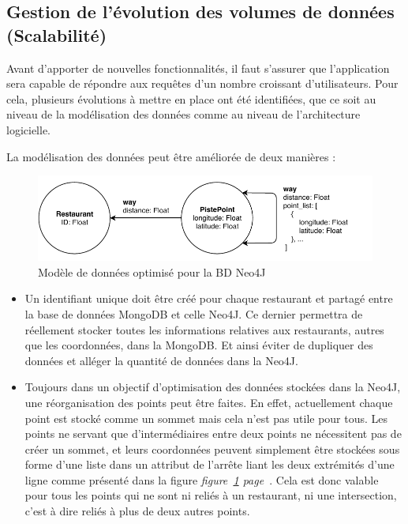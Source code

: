 \documentclass[12pt]{article}
\begin{document}
\subsection{Gestion de l'évolution des volumes de données (Scalabilité)}

    Avant d'apporter de nouvelles fonctionnalités, il faut s'assurer que l'application sera capable de répondre aux requêtes d'un nombre croissant d'utilisateurs. Pour cela, plusieurs évolutions à mettre en place ont été identifiées, que ce soit au niveau de la modélisation des données comme au niveau de l'architecture logicielle.

    La modélisation des données peut être améliorée de deux manières :

    \begin{figure}[h]
        \centering
        \includegraphics[scale=1]{images/updated_neo_model.pdf}
        \caption{\label{updated_neo_model} Modèle de données optimisé pour la BD Neo4J}
    \end{figure}
    
    \begin{itemize}
        \item Un identifiant unique doit être créé pour chaque restaurant et partagé entre la base de données MongoDB et celle Neo4J. Ce dernier permettra de réellement stocker toutes les informations relatives aux restaurants, autres que les coordonnées, dans la MongoDB. Et ainsi éviter de dupliquer des données et alléger la quantité de données dans la Neo4J.
        \item Toujours dans un objectif d'optimisation des données stockées dans la Neo4J, une réorganisation des points peut être faites. En effet, actuellement chaque point est stocké comme un sommet mais cela n'est pas utile pour tous. Les points ne servant que d'intermédiaires entre deux points ne nécessitent pas de créer un sommet, et leurs coordonnées peuvent simplement être stockées sous forme d'une liste dans un attribut de l'arrête liant les deux extrémités d'une ligne comme présenté dans la figure \emph{figure~\ref{updated_neo_model} page~\pageref{updated_neo_model}}. Cela est donc valable pour tous les points qui ne sont ni reliés à un restaurant, ni une intersection, c'est à dire reliés à plus de deux autres points.
    \end{itemize}
\end{document}

